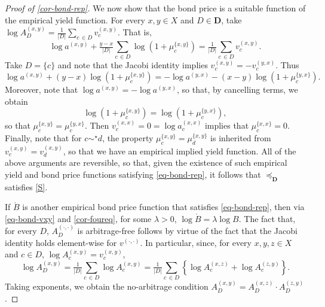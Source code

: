 \documentclass[ecta,nameyear,draft]{econsocart}
\newcommand{\mbbd}{{\mathbf D}}
\newcommand{\xx}{(x,x)}
\newcommand{\xy}{{(x, y)}}
\newcommand{\yx}{{(y, x)}}
\newcommand{\zy}{{(z,y)}}
\newcommand{\xz}{{(x,z)}}
\newcommand{\dd}{{(\cdot,\cdot)}}
\newcommand{\stability}{\ref{S}}
\theoremstyle{plain}
\theoremstyle{remark}
\begin{document}
\begin{proof}[Proof of \cref{cor-bond-rep}]
  We now show that the bond price is a suitable function of the empirical yield
  function.  For every $x,y \in X$ and $D \in \mbbd$, take $\log {A}^{\xy}_{D}
  = \tfrac{1}{\lvert D\rvert}\sum_{c\,\in D}v^{\xy}_{c}$.  That is,
  \begin{equation*}
    \log a^{\xy} + \tfrac{y - x}{\lvert D\rvert} \sum_{c\,\in D}\log
    \left(1+\mu^{\{x,y\}}_{c}\right) = \tfrac{1}{\lvert D\rvert}\sum_{c\,\in D}
    v^{\xy}_{c}. 
  \end{equation*}
  Take $D = \{c\}$ and note that the Jacobi identity implies $v^{\xy}_c = -
  v^{\yx}_c$. Thus
  \begin{equation*}
    \log a^{\xy} + (y - x) \log \left(1+\mu^{\{x,y\}}_{c}\right)
    = -\log a^{\yx} - (x - y) \log \left(1+\mu^{\{y,x\}}_{c}\right).
  \end{equation*}
  Moreover, note that $\log a^{\xy} = -\log a^{\yx}$, so that, by cancelling
  terms, we obtain
  \begin{equation}\label{eq-mu-sym}
    \log \left(1+\mu^{\{x,y\}}_{c}\right) = \log \left(1+\mu^{\{y,x\}}_{c}\right),
  \end{equation}
  so that $\mu^{\{x,y\}}_{c} = \mu^{\{y,x\}}_{c}$. Then $v^{\xx}_{c} = 0 = \log
  a^{\xx}_{c} $ implies that $\mu^{\{x,x\}}_{c} = 0$. Finally, note that for $c
  \sim^{\star} d$, the property $\mu^{\{x,y\}}_{c} = \mu^{\{x,y\}}_{d}$ is
  inherited from $v^{\xy}_{c} = v^{\xy}_{d}$, so that we have an empirical
  implied yield function. All of the above arguments are reversible, so that,
  given the existence of such empirical yield and bond price functions
  satisfying \eqref{eq-bond-rep}, it follows that $\preceq_{\mbbd}$ satisfies
  \stability.

  If $\acute{B}$ is another empirical bond price function that satisfies
  \eqref{eq-bond-rep}, then via \cref{eq-bond-vxy} and \cref{cor-foureq}, for
  some $\lambda >0$, $\log \acute{B} = \lambda \log B$.  The fact that, for every
  $D$, ${A}^{\dd}_{D}$ is arbitrage-free follows by virtue of the fact that the
  Jacobi identity holds element-wise for $v^{\dd}$.  In particular, since, for
  every $x, y , z \in X$ and $c \in D$, $\log {A}^{\xy}_{c} = v^{\xy}_{c}$, 
  \begin{equation*}
    \log {A}^{\xy}_{D} = \tfrac{1}{\lvert D\rvert}\sum_{c\,\in D}\log
    {A}^{\xy}_c
    = \tfrac{1}{\lvert D\rvert}\sum_{c\,\in D} \left\{\log {A}^{\xz}_c + \log
    {A}^{\zy}_c \right\}.
  \end{equation*} 
  Taking exponents, we obtain the no-arbitrage condition ${A}^{\xy}_{D} =
  {A}^{\xz}_{D} \cdot {A}^{\zy}_{D}$.
\end{proof}
\end{document}
